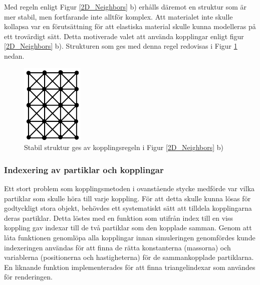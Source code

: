 \documentclass[a4paper,12pt,oneside,final,swedish]{extarticle}
\begin{document}
Med regeln enligt Figur \ref{2D_Neighbors} b) erhålls däremot en struktur som är mer stabil, men fortfarande inte alltför komplex. Att materialet inte skulle kollapsa var en förutsättning för att elastiska material skulle kunna modelleras på ett trovärdigt sätt. Detta motiverade valet att använda kopplingar enligt figur \ref{2D_Neighbors} b). Strukturen som ges med denna regel redovisas i Figur \ref{2D_stabil} nedan.

\begin{figure}[h!]
  \begin{center}
    \includegraphics[width=3cm]{Bilder/2D_stabil.png} 
  \end{center}
  \caption{Stabil struktur ges av kopplingsregeln i Figur \ref{2D_Neighbors} b)}
  \label{2D_stabil}
\end{figure}

\subsubsection{Indexering av partiklar och kopplingar}
Ett stort problem som kopplingsmetoden i ovanstående stycke medförde var vilka partiklar som skulle höra till varje koppling. För att detta skulle kunna lösas för godtyckligt stora objekt, behövdes ett systematiskt sätt att tilldela kopplingarna deras partiklar. Detta löstes med en funktion som utifrån index till en viss koppling gav indexar till de två partiklar som den kopplade samman. Genom att låta funktionen genomlöpa alla kopplingar innan simuleringen genomfördes kunde indexeringen användas för att finna de rätta konstanterna (massorna) och variablerna (positionerna och hastigheterna) för de sammankopplade partiklarna. En liknande funktion implementerades för att finna triangelindexar som användes för renderingen.
\end{document}
